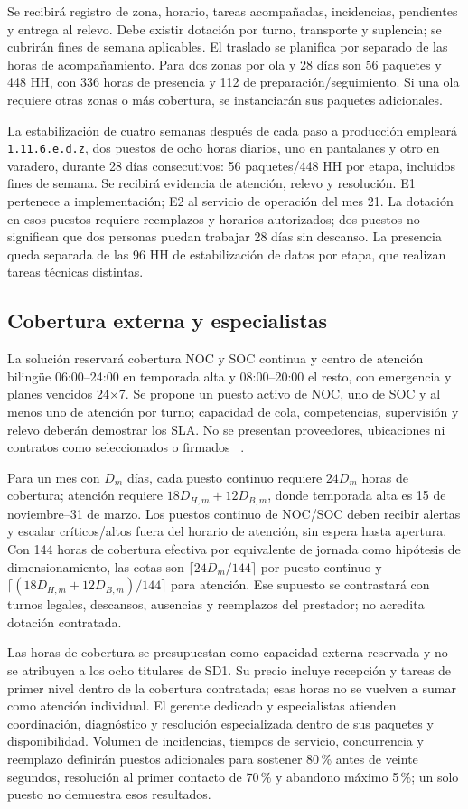 Se recibirá registro de zona, horario, tareas acompañadas, incidencias, pendientes y entrega al relevo. Debe existir dotación por turno, transporte y suplencia; se cubrirán fines de semana aplicables. El traslado se planifica por separado de las horas de acompañamiento. Para dos zonas por ola y 28 días son 56 paquetes y 448 HH, con 336 horas de presencia y 112 de preparación/seguimiento. Si una ola requiere otras zonas o más cobertura, se instanciarán sus paquetes adicionales.

La estabilización de cuatro semanas después de cada paso a producción empleará \texttt{1.11.6.e.d.z}, dos puestos de ocho horas diarios, uno en pantalanes y otro en varadero, durante 28 días consecutivos: 56 paquetes/448 HH por etapa, incluidos fines de semana. Se recibirá evidencia de atención, relevo y resolución. E1 pertenece a implementación; E2 al servicio de operación del mes 21. La dotación en esos puestos requiere reemplazos y horarios autorizados; dos puestos no significan que dos personas puedan trabajar 28 días sin descanso. La presencia queda separada de las 96 HH de estabilización de datos por etapa, que realizan tareas técnicas distintas.

\subsection{Cobertura externa y especialistas}
La solución reservará cobertura NOC y SOC continua y centro de atención bilingüe 06:00--24:00 en temporada alta y 08:00--20:00 el resto, con emergencia y planes vencidos 24$\times$7. Se propone un puesto activo de NOC, uno de SOC y al menos uno de atención por turno; capacidad de cola, competencias, supervisión y relevo deberán demostrar los SLA. No se presentan proveedores, ubicaciones ni contratos como seleccionados o firmados \parencite[RT-21.01/06; pp.~35--38]{bases-transversales}~\parencite[RT-21.06]{caso07}.

Para un mes con $D_m$ días, cada puesto continuo requiere $24D_m$ horas de cobertura; atención requiere $18D_{H,m}+12D_{B,m}$, donde temporada alta es 15 de noviembre--31 de marzo. Los puestos continuo de NOC/SOC deben recibir alertas y escalar críticos/altos fuera del horario de atención, sin espera hasta apertura. Con 144 horas de cobertura efectiva por equivalente de jornada como hipótesis de dimensionamiento, las cotas son $\lceil24D_m/144\rceil$ por puesto continuo y $\lceil(18D_{H,m}+12D_{B,m})/144\rceil$ para atención. Ese supuesto se contrastará con turnos legales, descansos, ausencias y reemplazos del prestador; no acredita dotación contratada.

Las horas de cobertura se presupuestan como capacidad externa reservada y no se atribuyen a los ocho titulares de SD1. Su precio incluye recepción y tareas de primer nivel dentro de la cobertura contratada; esas horas no se vuelven a sumar como atención individual. El gerente dedicado y especialistas atienden coordinación, diagnóstico y resolución especializada dentro de sus paquetes y disponibilidad. Volumen de incidencias, tiempos de servicio, concurrencia y reemplazo definirán puestos adicionales para sostener 80\,\% antes de veinte segundos, resolución al primer contacto de 70\,\% y abandono máximo 5\,\%; un solo puesto no demuestra esos resultados.
